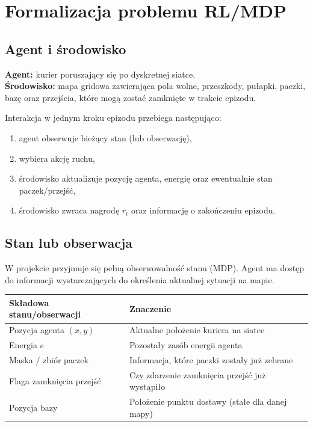 \documentclass[12pt]{article}
\begin{document}
\section{Formalizacja problemu RL/MDP}

\subsection{Agent i środowisko}

\textbf{Agent:} kurier poruszający się po dyskretnej siatce.\\
\textbf{Środowisko:} mapa gridowa zawierająca pola wolne, przeszkody, pułapki, paczki, bazę
oraz przejścia, które mogą zostać zamknięte w trakcie epizodu.

Interakcja w jednym kroku epizodu przebiega następująco:
\begin{enumerate}
    \item agent obserwuje bieżący stan (lub obserwację),
    \item wybiera akcję ruchu,
    \item środowisko aktualizuje pozycję agenta, energię oraz ewentualnie stan paczek/przejść,
    \item środowisko zwraca nagrodę $r_t$ oraz informację o zakończeniu epizodu.
\end{enumerate}

\subsection{Stan lub obserwacja}

W projekcie przyjmuje się pełną obserwowalność stanu (MDP).
Agent ma dostęp do informacji wystarczających do określenia aktualnej sytuacji na mapie.

\begin{center}
\begin{tabular}{p{}p{}}
\toprule
Składowa stanu/obserwacji & Znaczenie \\
\midrule
Pozycja agenta $(x, y)$ & Aktualne położenie kuriera na siatce \\
Energia $e$ & Pozostały zasób energii agenta \\
Maska / zbiór paczek & Informacja, które paczki zostały już zebrane \\
Flaga zamknięcia przejść & Czy zdarzenie zamknięcia przejść już wystąpiło \\
Pozycja bazy & Położenie punktu dostawy (stałe dla danej mapy) \\
\bottomrule
\end{tabular}
\end{center}
\end{document}
